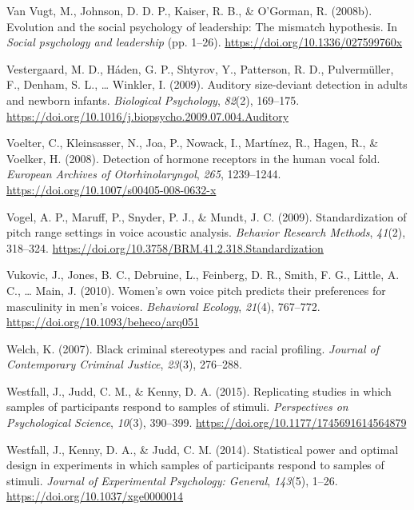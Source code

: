 \documentclass[
  english,
  man]{apa6}
\begin{document}
\leavevmode\hypertarget{ref-VanVugt2008}{}%
Van Vugt, M., Johnson, D. D. P., Kaiser, R. B., \& O'Gorman, R. (2008b). Evolution and the social psychology of leadership: The mismatch hypothesis. In \emph{Social psychology and leadership} (pp. 1--26). \url{https://doi.org/10.1336/027599760x}

\leavevmode\hypertarget{ref-Vestergaard2009}{}%
Vestergaard, M. D., Háden, G. P., Shtyrov, Y., Patterson, R. D., Pulvermüller, F., Denham, S. L., \ldots{} Winkler, I. (2009). Auditory size-deviant detection in adults and newborn infants. \emph{Biological Psychology}, \emph{82}(2), 169--175. \url{https://doi.org/10.1016/j.biopsycho.2009.07.004.Auditory}

\leavevmode\hypertarget{ref-Voelter2008}{}%
Voelter, C., Kleinsasser, N., Joa, P., Nowack, I., Martínez, R., Hagen, R., \& Voelker, H. (2008). Detection of hormone receptors in the human vocal fold. \emph{European Archives of Otorhinolaryngol}, \emph{265}, 1239--1244. \url{https://doi.org/10.1007/s00405-008-0632-x}

\leavevmode\hypertarget{ref-Vogel2009}{}%
Vogel, A. P., Maruff, P., Snyder, P. J., \& Mundt, J. C. (2009). Standardization of pitch range settings in voice acoustic analysis. \emph{Behavior Research Methods}, \emph{41}(2), 318--324. \url{https://doi.org/10.3758/BRM.41.2.318.Standardization}

\leavevmode\hypertarget{ref-Vukovic2010}{}%
Vukovic, J., Jones, B. C., Debruine, L., Feinberg, D. R., Smith, F. G., Little, A. C., \ldots{} Main, J. (2010). Women's own voice pitch predicts their preferences for masculinity in men's voices. \emph{Behavioral Ecology}, \emph{21}(4), 767--772. \url{https://doi.org/10.1093/beheco/arq051}

\leavevmode\hypertarget{ref-Welch2007}{}%
Welch, K. (2007). Black criminal stereotypes and racial profiling. \emph{Journal of Contemporary Criminal Justice}, \emph{23}(3), 276--288.

\leavevmode\hypertarget{ref-Westfall2015}{}%
Westfall, J., Judd, C. M., \& Kenny, D. A. (2015). Replicating studies in which samples of participants respond to samples of stimuli. \emph{Perspectives on Psychological Science}, \emph{10}(3), 390--399. \url{https://doi.org/10.1177/1745691614564879}

\leavevmode\hypertarget{ref-Westfall2014}{}%
Westfall, J., Kenny, D. A., \& Judd, C. M. (2014). Statistical power and optimal design in experiments in which samples of participants respond to samples of stimuli. \emph{Journal of Experimental Psychology: General}, \emph{143}(5), 1--26. \url{https://doi.org/10.1037/xge0000014}
\end{document}
